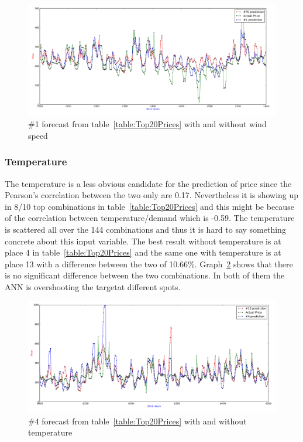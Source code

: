 \begin{figure}[H]
\centering
\includegraphics[width=\linewidth]{billeder/PriceExperimentalAnalysis/X1_windspeed_vs_no_windspeed.png}
\caption{\#1 forecast from table~\ref{table:Top20Prices} with and without wind speed}
\label{fig:Windspeed_no_windspeed}
\end{figure}

\subsubsection{Temperature}
The temperature is a less obvious candidate for the prediction of price since the Pearson's correlation between the two only are 0.17. Nevertheless it is showing up in 8/10 top combinations in table~\ref{table:Top20Prices} and this might be because of the correlation between temperature/demand which is -0.59. The temperature is scattered all over the 144 combinations and thus it is hard to say something concrete about this input variable. The best result without temperature is at place 4 in table~\ref{table:Top20Prices} and the same one with temperature is at place 13 with a difference between the two of 10.66\%. Graph~\ref{fig:temperature_comparison} shows that there is no significant difference between the two combinations. In both of them the ANN is overshooting the targetat different spots.

\begin{figure}[H]
\centering
\includegraphics[width=\linewidth]{billeder/PriceExperimentalAnalysis/temperatureComparison.png}
\caption{\#4 forecast from table~\ref{table:Top20Prices} with and without temperature}
\label{fig:temperature_comparison}
\end{figure}

